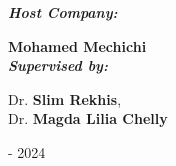 \begin{titlepage}
\begin{center}
\vspace{60pt}
\fontsize{15pt}{15pt}\selectfont%
\textbf{\textit{Host Company:}}\\

\vspace{8pt}
\renewcommand*{\familydefault}{\defaultFont}
\fontsize{14pt}{14pt}\selectfont%



\vspace{10pt} {%
  \fontsize{17pt}{17pt}\selectfont%
  \textbf{Mohamed Mechichi}\\
}%
\vspace{30pt}
\textbf{\textit{Supervised by:}}\\
\vspace{10pt} {%
  \fontsize{17pt}{17pt}\selectfont%
  Dr.\textbf{ Slim Rekhis}, \\
  Dr.\textbf{ Magda Lilia Chelly}
  
}%
\vspace{30pt} {\fontsize{14pt}{14pt} - 2024}



\end{center}
\end{titlepage}
